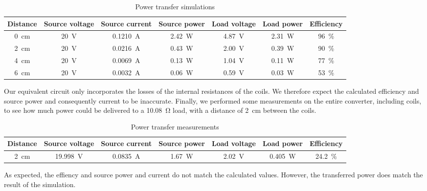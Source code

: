 \documentclass[11pt,titlepage]{report}
\begin{document}
\begin{table}[H]
	\centering
	\caption{Power transfer simulations}
	\label{tab:ass2-power-sim}
	\begin{tabular}{c c c c c c c}
		\hline\hline
		Distance & Source voltage & Source current & Source power & Load voltage & Load power & Efficiency \\
		\hline
		\SI{0}{cm} & \SI{20}{V} & \SI{0.1210}{A} & \SI{2.42}{W} & \SI{4.87}{V} & \SI{2.31}{W} & \SI{96}{\percent} \\
		\SI{2}{cm} & \SI{20}{V} & \SI{0.0216}{A} & \SI{0.43}{W} & \SI{2.00}{V} & \SI{0.39}{W} & \SI{90}{\percent} \\
		\SI{4}{cm} & \SI{20}{V} & \SI{0.0069}{A} & \SI{0.13}{W} & \SI{1.04}{V} & \SI{0.11}{W} & \SI{77}{\percent} \\
		\SI{6}{cm} & \SI{20}{V} & \SI{0.0032}{A} & \SI{0.06}{W} & \SI{0.59}{V} & \SI{0.03}{W} & \SI{53}{\percent} \\
		\hline
		\end{tabular}
\end{table}

Our equivalent circuit only incorporates the losses of the internal resistances of the coils. We therefore expect the calculated efficiency and source power and consequently current to be inaccurate. Finally, we performed some measurements on the entire converter, including coils, to see how much power could be delivered to a \SI{10.08}{\ohm} load, with a distance of \SI{2}{cm} between the coils.

\begin{table}[H]
	\centering
	\caption{Power transfer measurements}
	\label{tab:ass2-power}
	\begin{tabular}{c c c c c c c}
		\hline\hline
		Distance & Source voltage & Source current & Source power & Load voltage & Load power & Efficiency \\
		\hline
		\SI{2}{cm} & \SI{19.998}{V} & \SI{0.0835}{A} & \SI{1.67}{W} & \SI{2.02}{V} & \SI{0.405}{W} & \SI{24.2}{\percent} \\
		\hline
		\end{tabular}
\end{table}

As expected, the effiency and source power and current do not match the calculated values. However, the transferred power does match the result of the simulation.
\end{document}

